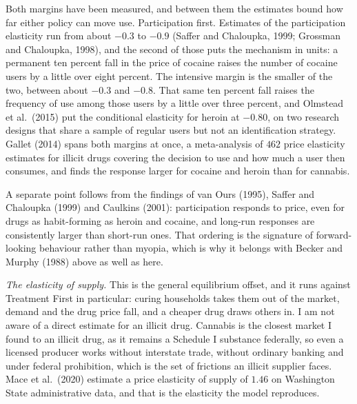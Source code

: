 \documentclass[10pt]{article}
\begin{document}
Both margins have been measured, and between them the estimates bound how far
either policy can move use. Participation first. Estimates of the participation
elasticity run from about $-0.3$ to $-0.9$ (Saffer and Chaloupka, 1999; Grossman and
Chaloupka, 1998), and the second of those puts the mechanism in units: a permanent ten
percent fall in the price of cocaine raises the number of cocaine users by a little
over eight percent. The intensive margin is the smaller of the two, between about
$-0.3$ and $-0.8$. That same ten percent fall raises the frequency of use among those
users by a little over three percent, and Olmstead et al.\ (2015) put the conditional
elasticity for heroin at $-0.80$, on two research designs that share a sample of
regular users but not an identification strategy. Gallet (2014) spans both margins at
once, a meta-analysis of $462$ price elasticity estimates for illicit drugs covering
the decision to use and how much a user then consumes, and finds the response larger
for cocaine and heroin than for cannabis.

A separate point follows from the findings of van Ours (1995), Saffer and Chaloupka (1999) and
Caulkins (2001): participation responds to price, even for drugs as habit-forming
as heroin and cocaine, and long-run responses are consistently larger than short-run
ones. That
ordering is the signature of forward-looking behaviour rather than myopia, which is
why it belongs with Becker and Murphy (1988) above as well as here.

\emph{The elasticity of supply.} This is the general equilibrium offset, and it
runs against Treatment First in particular: curing households takes them out of the
market, demand and the drug price fall, and a cheaper drug draws others in. I am not aware of a direct
estimate for an illicit drug. Cannabis is the closest market I found to an illicit
drug, as it remains a Schedule I substance federally, so even a licensed producer works
without interstate trade, without ordinary banking and under federal prohibition,
which is the set of frictions an illicit supplier faces. Mace et al.\ (2020) estimate a price elasticity of supply of
$1.46$ on Washington State administrative data, and that is the elasticity the model reproduces.
\end{document}
